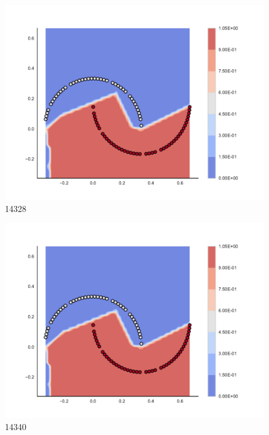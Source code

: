 \begin{subfigure}[b]{0.09\textwidth}
    \includegraphics[clip, trim=2.35cm 1.75cm 4.5cm 0cm,width=\textwidth]{img/convergence/14328.pdf}
    \caption{14328}
    \label{fig:convergence_14328}
\end{subfigure}
%
\begin{subfigure}[b]{0.09\textwidth}
    \includegraphics[clip, trim=2.35cm 1.75cm 4.5cm 0cm,width=\textwidth]{img/convergence/14340.pdf}
    \caption{14340}
    \label{fig:convergence_14340}
\end{subfigure}
%
